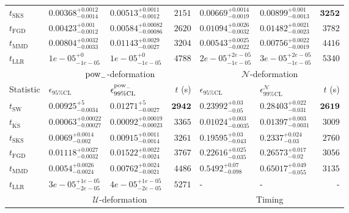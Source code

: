 \begin{tabular}{l|llr|llr}
	$t_{\mathrm{SKS}}$ & $0.00368_{-0.0014}^{+0.0012}$ & $0.00513_{-0.0012}^{+0.0011}$ & $2151$ & $0.00669_{-0.0019}^{+0.0014}$ & $0.00899_{-0.0013}^{+0.001}$ & ${\mathbf{3252}}$ \\
	$t_{\mathrm{FGD}}$ & $0.00423_{-0.0012}^{+0.001}$ & $0.00584_{-0.00086}^{+0.00082}$ & $2620$ & $0.01094_{-0.0032}^{+0.0026}$ & $0.01482_{-0.0023}^{+0.0021}$ & $3782$ \\
	$t_{\mathrm{MMD}}$ & $0.00804_{-0.0033}^{+0.0032}$ & $0.01143_{-0.0027}^{+0.0029}$ & $3204$ & $0.00543_{-0.0022}^{+0.0025}$ & $0.00756_{-0.0019}^{+0.0022}$ & $4416$ \\
	$t_{\mathrm{LLR}}$ & $1e-05_{-1e-05}^{+0}$ & $1e-05_{-1e-05}^{+0}$ & $4788$ & $2e-05_{-1e-05}^{+2e-05}$ & $3e-05_{-1e-05}^{+2e-05}$ & $5340$ \\
	\toprule
	\multicolumn{1}{c}{} & \multicolumn{3}{c}{$\rm{pow}_{-}$-deformation} & \multicolumn{3}{c}{$\mathcal{N}$-deformation} \\
	Statistic & $\epsilon_{95\%\mathrm{CL}}$ & $\epsilon^  {\rm{pow}_{-}}_{99\%\mathrm{CL}}$ & $t$ (s) & $\epsilon_{95\%\mathrm{CL}}$ & $\epsilon^    {\mathcal{N}}_{99\%\mathrm{CL}}$ & $t$ (s) \\
	\midrule
	$t_{\mathrm{SW}}$ & $0.00925_{-0.0034}^{+5}$ & $0.01271_{-0.0027}^{+5}$ & ${\mathbf{2942}}$ & $0.23992_{-0.05}^{+0.03}$ & $0.28403_{-0.031}^{+0.022}$ & ${\mathbf{2619}}$ \\
	$t_{\overline{\mathrm{KS}}}$ & ${\mathbf{0.00063_{-0.00027}^{+0.00022}}}$ & ${\mathbf{0.00092_{-0.00023}^{+0.00019}}}$ & $3365$ & ${\mathbf{0.01024_{-0.0035}^{+0.003}}}$ & ${\mathbf{0.01397_{-0.0031}^{+0.003}}}$ & $3009$ \\
	$t_{\mathrm{SKS}}$ & $0.0069_{-0.002}^{+0.0014}$ & $0.00915_{-0.0014}^{+0.0011}$ & $3261$ & $0.19595_{-0.043}^{+0.03}$ & $0.2337_{-0.03}^{+0.024}$ & $2760$ \\
	$t_{\mathrm{FGD}}$ & $0.01118_{-0.0032}^{+0.0027}$ & $0.01522_{-0.0024}^{+0.0022}$ & $3767$ & $0.22616_{-0.035}^{+0.025}$ & $0.26573_{-0.02}^{+0.017}$ & $3056$ \\
	$t_{\mathrm{MMD}}$ & $0.0054_{-0.0024}^{+0.0026}$ & $0.00762_{-0.0021}^{+0.0024}$ & $4486$ & $0.5492_{-0.098}^{+0.07}$ & $0.65017_{-0.055}^{+0.049}$ & $3135$ \\
	$t_{\mathrm{LLR}}$ & $3e-05_{-2e-05}^{+1e-05}$ & $4e-05_{-2e-05}^{+1e-05}$ & $5271$ & - & - & - \\
	\toprule
	\multicolumn{1}{c}{} & \multicolumn{3}{c}{$\mathcal{U}$-deformation} & \multicolumn{3}{c}{Timing} \\

\end{tabular}
